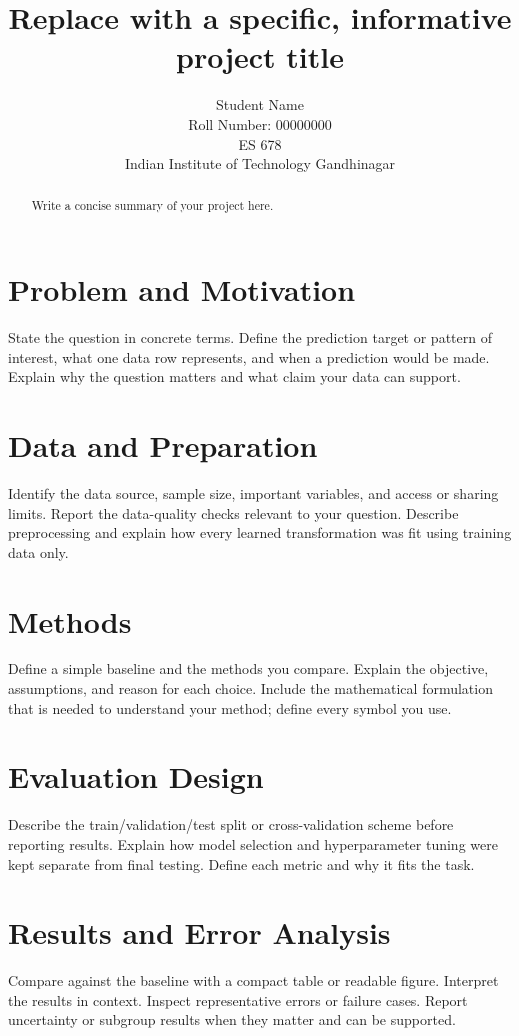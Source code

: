 \documentclass{article}
\title{Replace with a specific, informative project title}
\author{%
  Student Name \\
  Roll Number: 00000000 \\
  ES 678 \\
  Indian Institute of Technology Gandhinagar
}
\begin{document}
\maketitle

\begin{abstract}
Write a concise summary of your project here.
\end{abstract}

\section{Problem and Motivation}
State the question in concrete terms. Define the prediction target or pattern
of interest, what one data row represents, and when a prediction would be made.
Explain why the question matters and what claim your data can support.

\section{Data and Preparation}
Identify the data source, sample size, important variables, and access or
sharing limits. Report the data-quality checks relevant to your question.
Describe preprocessing and explain how every learned transformation was fit
using training data only.

\section{Methods}
Define a simple baseline and the methods you compare. Explain the objective,
assumptions, and reason for each choice. Include the mathematical formulation
that is needed to understand your method; define every symbol you use.

\section{Evaluation Design}
Describe the train/validation/test split or cross-validation scheme before
reporting results. Explain how model selection and hyperparameter tuning were
kept separate from final testing. Define each metric and why it fits the task.

\section{Results and Error Analysis}
Compare against the baseline with a compact table or readable figure. Interpret
the results in context. Inspect representative errors or failure cases. Report
uncertainty or subgroup results when they matter and can be supported.
\end{document}
